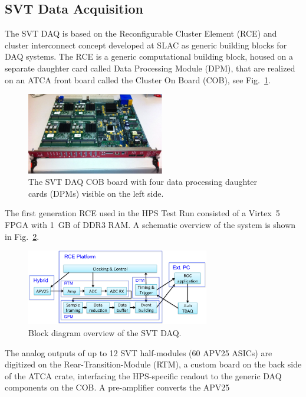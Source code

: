\documentclass[final,3p,times,twocolumn]{elsarticle}
\begin{document}
\subsection{SVT Data Acquisition}
\label{sec:svt_daq}
The SVT DAQ is based on the Reconfigurable Cluster Element (RCE) and cluster 
interconnect concept developed at SLAC as generic building blocks for DAQ systems. 
The RCE is a generic computational building block, housed on a separate daughter card called 
Data Processing Module (DPM), that are realized on an ATCA front board called the Cluster On Board 
(COB), see Fig.~\ref{fig:cob}.
 \begin{figure}[]
\begin{center}
{\small
	\includegraphics[width=6cm]{figures/svt_daq_module}
	\caption{The SVT DAQ COB board with four data processing daughter cards (DPMs) visible on the left side.}
	\label{fig:cob}
}
\end{center}
\end{figure}
The first generation RCE used in the HPS Test Run consisted of a Virtex~5 FPGA with 1~GB of DDR3 RAM. 
A schematic overview of the system is shown in Fig.~\ref{fig:svtdaq}. 
 \begin{figure}[]
\begin{center}
{\small
	\includegraphics[width=8cm]{figures/svt-daq-sketch}
	\caption{Block diagram overview of the SVT DAQ.}
	\label{fig:svtdaq}
}
\end{center}
\end{figure}
The analog outputs of up to 12 SVT half-modules (60 APV25 ASICs) are digitized on the 
Rear-Transition-Module (RTM), a custom board on the back side of the ATCA crate, interfacing the 
HPS-specific readout to the generic DAQ components on the COB. A pre-amplifier converts the APV25 
\end{document}
